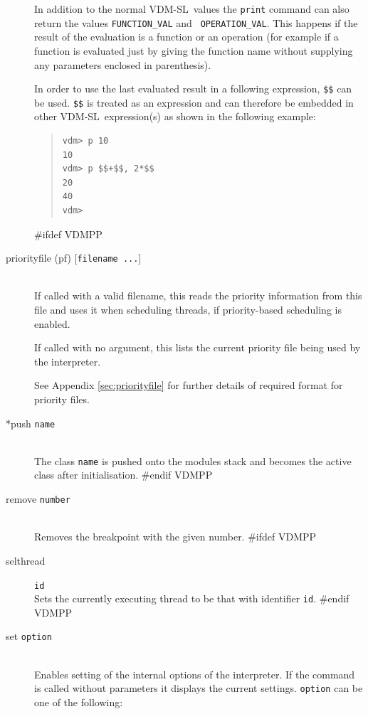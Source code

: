 \documentclass[\pformat,12pt]{article}
\newcommand{\vdmslpp}{VDM-SL}
\newcommand{\vdmslpp}{VDM++}
\begin{document}
\begin{description}
  In addition to the normal \vdmslpp\ values the {\tt print} command
  can also return the values {\tt FUNCTION\_VAL} and {\tt
    OPERATION\_VAL}\@.  This happens if the result of the evaluation is
  a function or an operation (for example if a function
  is evaluated just by giving the function name without supplying any
  parameters enclosed in parenthesis).
  
  In order to use the last evaluated result in a following expression,
  {\tt \$\$} can be used.  {\tt \$\$} is treated as an expression and
  can therefore be embedded in other \vdmslpp\ expression(s) as shown
  in the following   example:

\begin{quote}
\begin{verbatim}
vdm> p 10
10
vdm> p $$+$$, 2*$$
20
40
vdm> 
\end{verbatim}
\end{quote}

#ifdef VDMPP
\item[priorityfile (pf) \mbox{[{\tt filename ...}]}] \mbox{}\\
  If called with a valid filename, this reads the priority information
  from this file and uses it when scheduling threads, if
  priority-based scheduling is enabled.
  
  If called with no argument, this lists the current priority file being
  used by the interpreter.

  See Appendix \ref{sec:priorityfile} for further details of required
  format for priority files.

\item[*push {\tt name}] \mbox{}\\
  The class {\tt name}\/ is pushed onto the modules stack and becomes
  the active class after initialisation. 
#endif VDMPP

\item[remove \mbox{\texttt{number}}]
\mbox{}\\
  Removes the breakpoint with the given number.
#ifdef VDMPP
\item[selthread]\texttt{id}\mbox{}\\
  Sets the currently executing thread to be that with identifier
  \texttt{id}.
#endif VDMPP

\item[set {\tt option} \ifthenelse{\boolean{VDMsl}}{\mbox{[{\tt
        argument}]}}{}]\mbox{}\\
  Enables setting of the internal options of the interpreter.  If the
  command is called without parameters it displays the current
  settings. {\tt option}\/ can be one of the following:
  

\end{description}
\end{document}
